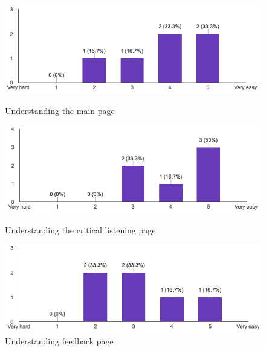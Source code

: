 \begin{figure}[!ht]
	\centering
	\begin{minipage}{.5\textwidth}
		\centering
		\includegraphics[scale=0.4]{Figures/responses/understanding_main.png}
		\caption{Understanding the main page}
		\label{fig:understanding_main}
	\end{minipage}%
	\begin{minipage}{.5\textwidth}
		\centering
		\includegraphics[scale=0.4]{Figures/responses/understanding_listening.png}
		\caption{Understanding the critical listening page}
		\label{fig:understanding_listening}
	\end{minipage}
	\begin{minipage}{.5\textwidth}
		\centering
		\includegraphics[scale=0.4]{Figures/responses/understanding_feedback.png}
		\caption{Understanding feedback page}
		\label{fig:understanding_feedback}
	\end{minipage}%
\end{figure}

